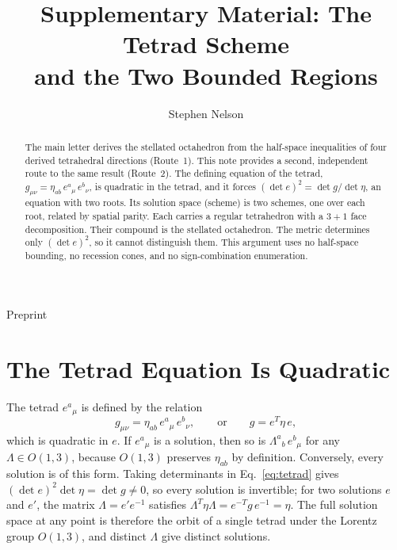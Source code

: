 \documentclass[twocolumn]{iopjournal}
\renewcommand{\articletype}[1]{%
  {\vspace*{-8mm}\noindent \Large \sf Preprint}\par
  \vspace*{6mm}\noindent{\scriptsize \sf{\bfseries \MakeUppercase{#1}}}}
\begin{document}
\articletype{Supplementary Material}

\title{Supplementary Material: The Tetrad Scheme\\and the Two Bounded Regions}

\author{Stephen Nelson}


\begin{abstract}
The main letter derives the stellated octahedron from the half-space inequalities of four derived tetrahedral directions (Route~1). This note provides a second, independent route to the same result (Route~2). The defining equation of the tetrad, $g_{\mu\nu} = \eta_{ab}\, e^a{}_\mu\, e^b{}_\nu$, is quadratic in the tetrad, and it forces $(\det e)^2 = \det g / \det \eta$, an equation with two roots. Its solution space (scheme) is two schemes, one over each root, related by spatial parity. Each carries a regular tetrahedron with a $3+1$ face decomposition. Their compound is the stellated octahedron. The metric determines only $(\det e)^2$, so it cannot distinguish them. This argument uses no half-space bounding, no recession cones, and no sign-combination enumeration.
\end{abstract}



\section*{The Tetrad Equation Is Quadratic}

The tetrad $e^a{}_\mu$ is defined by the relation
\begin{equation}
g_{\mu\nu} = \eta_{ab}\, e^a{}_\mu\, e^b{}_\nu, \qquad\text{or}\qquad g = e^T \eta\, e,
\label{eq:tetrad}
\end{equation}
which is quadratic in $e$. If $e^a{}_\mu$ is a solution, then so is $\Lambda^a{}_b\, e^b{}_\mu$ for any $\Lambda \in O(1,3)$, because $O(1,3)$ preserves $\eta_{ab}$ by definition. Conversely, every solution is of this form. Taking determinants in Eq.~\eqref{eq:tetrad} gives $(\det e)^2 \det \eta = \det g \neq 0$, so every solution is invertible; for two solutions $e$ and $e'$, the matrix $\Lambda = e' e^{-1}$ satisfies $\Lambda^T \eta \Lambda = e^{-T} g\, e^{-1} = \eta$. The full solution space at any point is therefore the orbit of a single tetrad under the Lorentz group $O(1,3)$, and distinct $\Lambda$ give distinct solutions.
\end{document}
